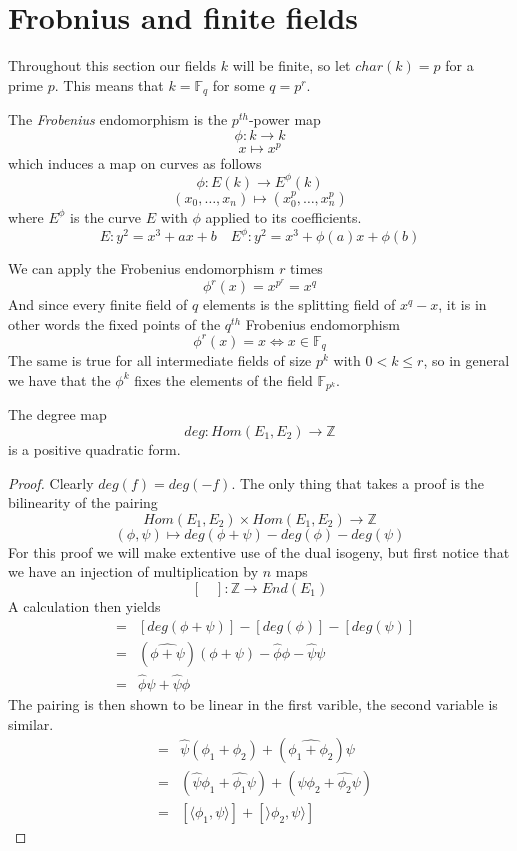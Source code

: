 \section{Frobnius and finite fields} \label{frob}
Throughout this section our fields $k$ will be finite, so let $char(k) = p$ for
a prime $p$. This means that $k = \mathbb{F}_{q}$ for some $q = p^r$.

\begin{mydef}
 The \emph{Frobenius} endomorphism is the $p^{th}$-power map
$$ \phi: k \rightarrow k $$
$$ x \mapsto x^p $$
which induces a map on curves as follows
$$ \phi: E(k) \rightarrow E^{\phi}(k) $$
$$ (x_0,\ldots , x_n) \mapsto (x_0^p, \ldots , x_n^p) $$
where $E^{\phi}$ is the curve $E$ with $\phi$ applied to its coefficients.
$$E: y^2 = x^3 + ax + b \quad E^{\phi}: y^2 = x^3 + \phi(a)x + \phi(b) $$
\end{mydef}

We can apply the Frobenius endomorphism $r$ times $$\phi^r(x) = x^{p^r} = x^q$$
And since every finite field of $q$ elements is the splitting field of $x^{q}-x$, it is in other words
the fixed points of the $q^{th}$ Frobenius endomorphism
$$ \phi^r(x) = x \iff x \in \mathbb{F}_q $$
The same is true for all intermediate fields of size $p^k$ with $0 < k \leq r$, so in general
we have that the $\phi^k$ fixes the elements of the field $\mathbb{F}_{p^k}$.
\begin{prop}
 The degree map
$$ deg: Hom(E_1, E_2) \rightarrow \mathbb{Z} $$
is a positive quadratic form.
\end{prop}
\begin{proof}
 Clearly $deg(f) = deg(-f)$. The only thing that takes a proof is the
bilinearity of the pairing
$$ Hom(E_1, E_2) \times Hom(E_1, E_2) \rightarrow \mathbb{Z}$$
$$ (\phi, \psi) \mapsto deg(\phi + \psi) - deg(\phi) - deg(\psi) $$
For this proof we will make extentive use of the dual isogeny, but first
notice that we have an injection of multiplication by $n$ maps
$$ [\quad]: \mathbb{Z} \rightarrow End(E_1) $$
A calculation then yields 
\begin{eqnarray*} 
 [\langle \phi,\psi \rangle] &=& [deg(\phi+\psi)]-[deg(\phi)]-[deg(\psi)] \nonumber \\
               &=& (\widehat{\phi+\psi})(\phi+\psi) - \widehat{\phi}\phi - \widehat{\psi}\psi \nonumber \\
	       &=& \widehat{\phi}\psi + \widehat{\psi}\phi
\end{eqnarray*}
The pairing is then shown to be linear in the first varible, the second variable is
similar.
\begin{eqnarray*}
 [\langle \phi_1+\phi_2, \psi \rangle] &=& \widehat{\psi}(\phi_1+\phi_2) + (\widehat{\phi_1+\phi_2})\psi \nonumber \\
			 &=& (\widehat{\psi}\phi_1+\widehat{\phi_1}\psi) + (\widehat{\psi}\phi_2 + \widehat{\phi_2}\psi) \nonumber \\
			 &=& [\langle \phi_1,\psi \rangle] + [\rangle \phi_2,\psi \rangle] 
\end{eqnarray*}
\end{proof}

